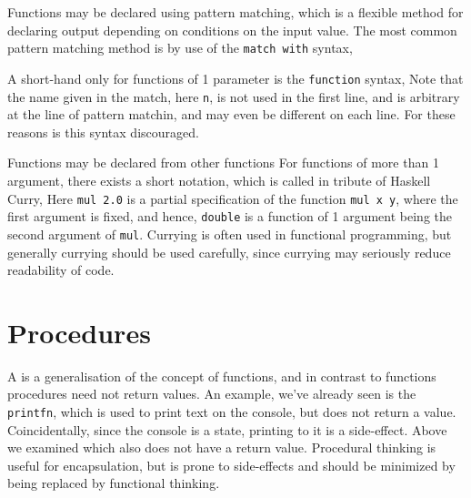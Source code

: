 Functions may be declared using pattern matching, which is a flexible method for declaring output depending on conditions on the input value. The most common pattern matching method is by use of the \texttt{match with} syntax,

A short-hand only for functions of 1 parameter is the \texttt{function} syntax,
Note that the name given in the match, here \texttt{n}, is not used in the first line, and is arbitrary at the line of pattern matchin, and may even be different on each line. For these reasons is this syntax discouraged.

Functions may be declared from other functions
For functions of more than 1 argument, there exists a short notation, which is called  in tribute of Haskell Curry,
Here \texttt{mul 2.0} is a partial specification of the function \texttt{mul x y}, where the first argument is fixed, and hence, \texttt{double} is a function of 1 argument being the second argument of \texttt{mul}. Currying is often used in functional programming, but generally currying should be used carefully, since currying may seriously reduce readability of code.

\section{Procedures}
A  is a generalisation of the concept of functions, and in contrast to functions procedures need not return values. An example, we've already seen is the \texttt{printfn}, which is used to print text on the console, but does not return a value. Coincidentally, since the console is a state, printing to it is a side-effect. Above we examined 
which also does not have a return value. Procedural thinking is useful for encapsulation, but is prone to side-effects and should be minimized by being replaced by functional thinking.


